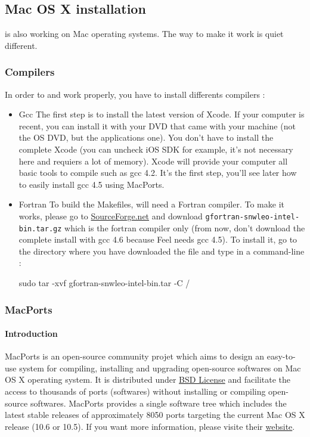 \subsection{Mac OS X installation}
\label{macosx}
\feel is also working on Mac operating systems. The way to make it work is quiet different.
\subsubsection{Compilers}
In order to \feel and \cmake work properly, you have to install differents compilers :
\begin{itemize}
\item Gcc \newline
The first step is to install the latest version of Xcode. If your computer is recent, you can install it with your DVD that came with your machine (not the OS DVD, but the applications one). You don't have to install the complete Xcode (you can uncheck iOS SDK for example, it's not necessary here and requiers a lot of memory). Xcode will provide your computer all basic tools to compile such as gcc 4.2. It's the first step, you'll see later how to easily install gcc 4.5 using MacPorts.
\item Fortran \newline
To build the Makefiles, \cmake will need a Fortran compiler. To make it works, please go to \href{http://hpc.sourceforge.net/}{SourceForge.net} and download \verb|gfortran-snwleo-intel-bin.tar.gz| which is the fortran compiler only (from now, don't download the complete install with gcc 4.6 because Feel needs gcc 4.5). To install it, go to the directory where you have downloaded the file and type in a command-line : 
\begin{unixcom}
		sudo tar -xvf gfortran-snwleo-intel-bin.tar -C /
\end{unixcom}

\end{itemize}

\subsubsection{MacPorts}

\paragraph{Introduction} 
MacPorts is an open-source community projet which aims to design an easy-to-use system for compiling, installing and upgrading open-source softwares on Mac OS X operating system. It is distributed under \href{http://opensource.org/licenses/bsd-license.php}{BSD License} and facilitate the access to thousands of ports (softwares) without installing or compiling open-source softwares. \newline \newline
MacPorts provides a single software tree which includes the latest stable releases of approximately 8050 ports targeting the current Mac OS X release (10.6 or 10.5). If you want more information, please visite their \href{http://www.macports.org/}{website}.

